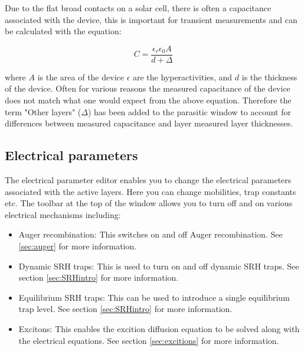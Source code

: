 Due to the flat broad contacts on a solar cell, there is often a capacitance associated with the device, this is important for transient measurements and can be calculated with the equation:

\begin{equation}
C=\frac{\epsilon_r \epsilon_0 A}{d+\Delta}
\end{equation}

where $A$ is the area of the device $\epsilon$ are the hyperactivities, and $d$ is the thickness of the device.  Often for various reasons the measured capacitance of the device does not match what one would expect from the above equation. Therefore the term "Other layers" ($\Delta$) has been added to the parasitic window to account for differences between measured capacitance and layer measured layer thicknesses.

\newpage
\subsection{Electrical parameters}
\label{sec:doseditor}
The electrical parameter editor enables you to change the electrical parameters associated with the active layers. Here you can change mobilities, trap constants etc.  The toolbar at the top of the window allows you to turn off and on various electrical mechanisms including:

\begin{itemize}
  \item Auger recombination: This switches on and off Auger recombination. See \ref{sec:auger} for more information.
  \item Dynamic SRH traps: This is used to turn on and off dynamic SRH traps.  See section \ref{sec:SRHintro} for more information.
  \item Equilibrium SRH traps: This can be used to introduce a single equilibrium trap level.  See section \ref{sec:SRHintro} for more information.
  \item Excitons: This enables the excition diffusion equation to be solved along with the electrical equations. See section \ref{sec:excitions} for more information.
\end{itemize}

